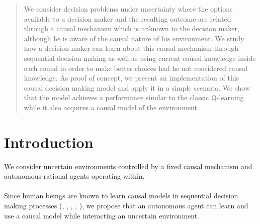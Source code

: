 \documentclass[a0,portrait]{a0poster}
\begin{document}
\begin{multicols}{3} %


\color{Navy} %

\begin{abstract}
We consider decision problems under uncertainty where the options available to a decision maker and the resulting outcome are related through a causal mechanism which is unknown to the decision maker, although he is aware of the causal nature of his environment. We study how a decision maker can learn about this causal mechanism through sequential decision making as well as using current causal knowledge inside each round in order to make better choices had he not considered causal knowledge. As proof of concept, we present an implementation of this causal decision making model and apply it in a simple scenario. We show that the model achieves a performance similar to the classic Q-learning while it also acquires a causal model of the environment. 
\end{abstract}


\color{SaddleBrown} %
\section*{Introduction}
We consider uncertain environments controlled by a fixed causal mechanism and autonomous rational agents operating within.\\
\\
Since human beings are known to learn causal models in sequential decision making processes (\cite{sloman2006causal}, \cite{nichols2007decision}, \cite{meder2010observing}, \cite{hagmayer2013repeated}, \cite{danks2014unifying}), we propose that an autonomous agent can learn and use a causal model while interacting an uncertain environment.\\




\end{multicols}
\end{document}
